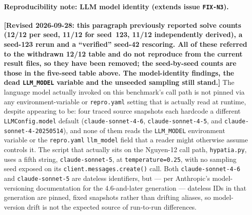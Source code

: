 \documentclass[twoside,11pt]{article}
\begin{document}
\paragraph{Reproducibility note: LLM model identity (extends issue
\texttt{FIX-N3}).} \textbf{[Revised 2026-09-28: this paragraph previously reported
solve counts (12/12 per seed, 11/12 for seed~123, 11/12 independently derived), a
seed-123 rerun and a ``verified'' seed-42 rescoring. All of these referred to the
withdrawn 12/12 table and do not reproduce from the current result files, so they
have been removed; the seed-by-seed counts are those in the five-seed table
above. The model-identity findings, the dead \texttt{LLM\_MODEL} variable and the
unseeded sampling still stand.]} The language model actually
invoked on this benchmark's call path is not pinned via any
environment-variable or \texttt{repro.yaml} setting that is actually read
at runtime, despite appearing to be: four traced source snapshots each
hardcode a different \texttt{LLMConfig.model} default
(\texttt{claude-sonnet-4-6}, \texttt{claude-sonnet-4-5}, and
\texttt{claude-sonnet-4-20250514}), and none of them reads the
\texttt{LLM\_MODEL} environment variable or the \texttt{repro.yaml}
\texttt{llm\_model} field that a reader might otherwise assume controls
it. The script that actually sits on the Nguyen-12 call path,
\texttt{hypatia.py}, uses a fifth string, \texttt{claude-sonnet-5}, at
\texttt{temperature=0.25}, with no sampling seed exposed on its
\texttt{client.messages.create()} call. Both \texttt{claude-sonnet-4-6}
and \texttt{claude-sonnet-5} are dateless identifiers, but --- per
Anthropic's model-versioning documentation for the 4.6-and-later
generation --- dateless IDs in that generation are pinned, fixed
snapshots rather than drifting aliases, so model-version drift is not the
expected source of run-to-run differences.
\end{document}
